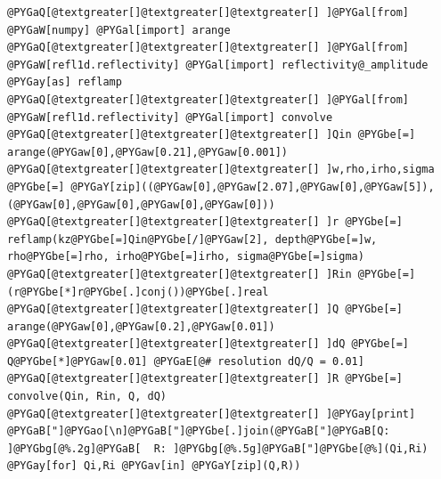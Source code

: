 \documentclass[letterpaper,10pt,english]{sphinxmanual}
\begin{document}
\begin{Verbatim}[commandchars=@\[\]]
@PYGaQ[@textgreater[]@textgreater[]@textgreater[] ]@PYGal[from] @PYGaW[numpy] @PYGal[import] arange
@PYGaQ[@textgreater[]@textgreater[]@textgreater[] ]@PYGal[from] @PYGaW[refl1d.reflectivity] @PYGal[import] reflectivity@_amplitude @PYGay[as] reflamp
@PYGaQ[@textgreater[]@textgreater[]@textgreater[] ]@PYGal[from] @PYGaW[refl1d.reflectivity] @PYGal[import] convolve
@PYGaQ[@textgreater[]@textgreater[]@textgreater[] ]Qin @PYGbe[=] arange(@PYGaw[0],@PYGaw[0.21],@PYGaw[0.001])
@PYGaQ[@textgreater[]@textgreater[]@textgreater[] ]w,rho,irho,sigma @PYGbe[=] @PYGaY[zip]((@PYGaw[0],@PYGaw[2.07],@PYGaw[0],@PYGaw[5]),(@PYGaw[0],@PYGaw[0],@PYGaw[0],@PYGaw[0]))
@PYGaQ[@textgreater[]@textgreater[]@textgreater[] ]r @PYGbe[=] reflamp(kz@PYGbe[=]Qin@PYGbe[/]@PYGaw[2], depth@PYGbe[=]w, rho@PYGbe[=]rho, irho@PYGbe[=]irho, sigma@PYGbe[=]sigma)
@PYGaQ[@textgreater[]@textgreater[]@textgreater[] ]Rin @PYGbe[=] (r@PYGbe[*]r@PYGbe[.]conj())@PYGbe[.]real
@PYGaQ[@textgreater[]@textgreater[]@textgreater[] ]Q @PYGbe[=] arange(@PYGaw[0],@PYGaw[0.2],@PYGaw[0.01])
@PYGaQ[@textgreater[]@textgreater[]@textgreater[] ]dQ @PYGbe[=] Q@PYGbe[*]@PYGaw[0.01] @PYGaE[@# resolution dQ/Q = 0.01]
@PYGaQ[@textgreater[]@textgreater[]@textgreater[] ]R @PYGbe[=] convolve(Qin, Rin, Q, dQ)
@PYGaQ[@textgreater[]@textgreater[]@textgreater[] ]@PYGay[print] @PYGaB["]@PYGao[\n]@PYGaB["]@PYGbe[.]join(@PYGaB["]@PYGaB[Q: ]@PYGbg[@%.2g]@PYGaB[  R: ]@PYGbg[@%.5g]@PYGaB["]@PYGbe[@%](Qi,Ri) @PYGay[for] Qi,Ri @PYGav[in] @PYGaY[zip](Q,R))
\end{Verbatim}
\end{document}

